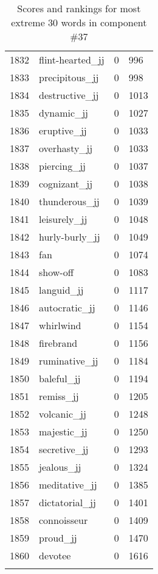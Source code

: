 \begin{longtable}[!htbp]{| rlr@{.}l |}
    1832 & flint-hearted\_jj & 0 & 996 \\
    1833 & precipitous\_jj & 0 & 998 \\
    1834 & destructive\_jj & 0 & 1013 \\
    1835 & dynamic\_jj & 0 & 1027 \\
    1836 & eruptive\_jj & 0 & 1033 \\
    1837 & overhasty\_jj & 0 & 1033 \\
    1838 & piercing\_jj & 0 & 1037 \\
    1839 & cognizant\_jj & 0 & 1038 \\
    1840 & thunderous\_jj & 0 & 1039 \\
    1841 & leisurely\_jj & 0 & 1048 \\
    1842 & hurly-burly\_jj & 0 & 1049 \\
    1843 & fan & 0 & 1074 \\
    1844 & show-off & 0 & 1083 \\
    1845 & languid\_jj & 0 & 1117 \\
    1846 & autocratic\_jj & 0 & 1146 \\
    1847 & whirlwind & 0 & 1154 \\
    1848 & firebrand & 0 & 1156 \\
    1849 & ruminative\_jj & 0 & 1184 \\
    1850 & baleful\_jj & 0 & 1194 \\
    1851 & remiss\_jj & 0 & 1205 \\
    1852 & volcanic\_jj & 0 & 1248 \\
    1853 & majestic\_jj & 0 & 1250 \\
    1854 & secretive\_jj & 0 & 1293 \\
    1855 & jealous\_jj & 0 & 1324 \\
    1856 & meditative\_jj & 0 & 1385 \\
    1857 & dictatorial\_jj & 0 & 1401 \\
    1858 & connoisseur & 0 & 1409 \\
    1859 & proud\_jj & 0 & 1470 \\
    1860 & devotee & 0 & 1616 \\
    \hline
    \caption{Scores and rankings for most extreme 30 words in component \#37} \\
\end{longtable}
